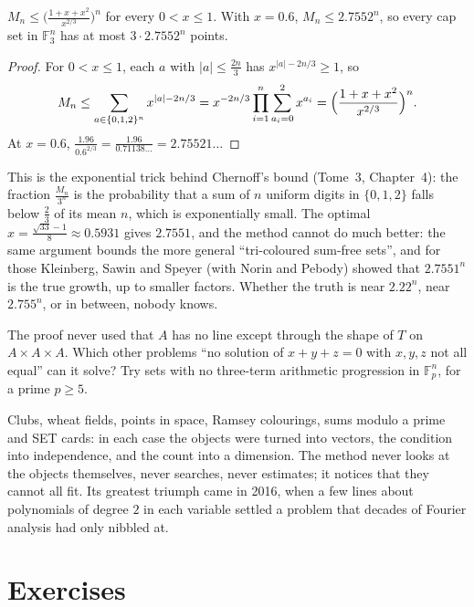 \begin{proposition}\label{prop:mn}
$M_n\le\bigl(\frac{1+x+x^2}{x^{2/3}}\bigr)^n$ for every $0<x\le1$. With $x=0.6$, $M_n\le2.7552^n$, so every cap set in $\mathbb F_3^n$ has at most $3\cdot2.7552^n$ points.
\end{proposition}
\begin{proof}
For $0<x\le1$, each $a$ with $|a|\le\frac{2n}3$ has $x^{|a|-2n/3}\ge1$, so
\[
M_n\le\sum_{a\in\{0,1,2\}^n}x^{|a|-2n/3}=x^{-2n/3}\prod_{i=1}^n\sum_{a_i=0}^2x^{a_i}=\Bigl(\frac{1+x+x^2}{x^{2/3}}\Bigr)^n.
\]
At $x=0.6$, $\frac{1.96}{0.6^{2/3}}=\frac{1.96}{0.71138\ldots}=2.75521\ldots$
\end{proof}

This is the exponential trick behind Chernoff's bound (Tome~3, Chapter~4): the fraction $\frac{M_n}{3^n}$ is the probability that a sum of $n$ uniform digits in $\{0,1,2\}$ falls below $\frac23$ of its mean $n$,
which is exponentially small. The optimal $x=\frac{\sqrt{33}-1}8\approx0.5931$ gives $2.7551$, and the method cannot do much better: the same argument bounds the more general ``tri-coloured sum-free sets'', and for those Kleinberg, Sawin and Speyer (with Norin and Pebody) showed that
$2.7551^n$ is the true growth, up to smaller factors.
Whether the truth is near $2.22^n$, near $2.755^n$, or in between, nobody knows.

\begin{think}
The proof never used that $A$ has no line except through the shape of $T$ on $A\times A\times A$. Which other problems ``no solution of $x+y+z=0$ with $x,y,z$ not all equal'' can it solve? Try sets with no
three-term arithmetic progression in $\mathbb F_p^n$, for a prime $p\ge5$.
\end{think}

\begin{beauty}
Clubs, wheat fields, points in space, Ramsey colourings, sums modulo a prime and SET cards: in each case the objects were turned into vectors, the condition into independence, and the count into a dimension.
The method never looks at the objects themselves, never searches, never estimates; it notices that they cannot all fit. Its greatest triumph came in 2016, when a few lines about polynomials of
degree $2$ in each variable settled a problem that decades of Fourier analysis had only nibbled at.
\end{beauty}

\section{Exercises}

